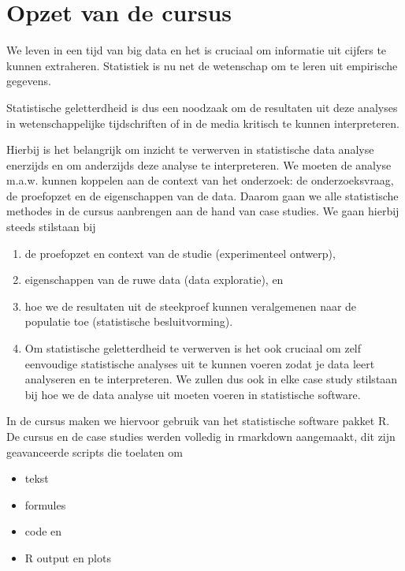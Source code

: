 \documentclass[
  dutch,
  letterpaper,
  12pt]{book}
\providecommand{\tightlist}{%
  \setlength{\itemsep}{0pt}\setlength{\parskip}{0pt}}
\theoremstyle{definition}
\theoremstyle{definition}
\theoremstyle{definition}
\theoremstyle{remark}
\begin{document}
\section{Opzet van de cursus}\label{opzet-van-de-cursus}

We leven in een tijd van big data en het is cruciaal om informatie uit
cijfers te kunnen extraheren. Statistiek is nu net de wetenschap om te
leren uit empirische gegevens.

Statistische geletterdheid is dus een noodzaak om de resultaten uit deze
analyses in wetenschappelijke tijdschriften of in de media kritisch te
kunnen interpreteren.

Hierbij is het belangrijk om inzicht te verwerven in statistische data
analyse enerzijds en om anderzijds deze analyse te interpreteren. We
moeten de analyse m.a.w. kunnen koppelen aan de context van het
onderzoek: de onderzoeksvraag, de proefopzet en de eigenschappen van de
data. Daarom gaan we alle statistische methodes in de cursus aanbrengen
aan de hand van case studies. We gaan hierbij steeds stilstaan bij

\begin{enumerate}
\def\labelenumi{\arabic{enumi}.}
\item
  de proefopzet en context van de studie (experimenteel ontwerp),
\item
  eigenschappen van de ruwe data (data exploratie), en
\item
  hoe we de resultaten uit de steekproef kunnen veralgemenen naar de
  populatie toe (statistische besluitvorming).
\item
  Om statistische geletterdheid te verwerven is het ook cruciaal om zelf
  eenvoudige statistische analyses uit te kunnen voeren zodat je data
  leert analyseren en te interpreteren. We zullen dus ook in elke case
  study stilstaan bij hoe we de data analyse uit moeten voeren in
  statistische software.
\end{enumerate}

In de cursus maken we hiervoor gebruik van het statistische software
pakket R. De cursus en de case studies werden volledig in rmarkdown
aangemaakt, dit zijn geavanceerde scripts die toelaten om

\begin{itemize}
\tightlist
\item
  tekst
\item
  formules
\item
  code en
\item
  R output en plots
\end{itemize}
\end{document}
